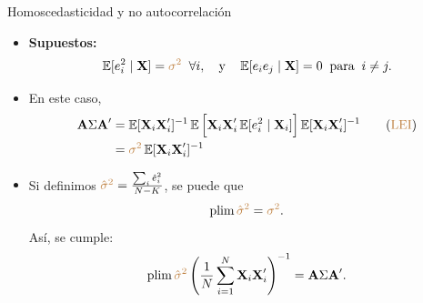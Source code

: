 \documentclass[10pt, xcolor=dvipsnames]{beamer}
\begin{document}
\begin{frame}{Homoscedasticidad y no autocorrelación}\label{DIAP:estVarCons}
\begin{itemize}
    \item \textbf{Supuestos:}
    \vspace{-0.75em}
    \[
    \operatorname{\mathbb{E}}[e_i^2 \mid \textbf{X}] = \textcolor{brown}{\sigma^2} \;\; \forall i, \quad \text{y} \quad \operatorname{\mathbb{E}}[e_i e_j \mid \textbf{X}] = 0 \;\; \text{para} \;\; i \neq j.
    \]
    \pause
    \item En este caso,
    \vspace{-0.75em}
    \begin{align*}
    \begin{split}
        \textbf{A} \Sigma \textbf{A}' &= \operatorname{\mathbb{E}}[\textbf{X}_i \textbf{X}_i']^{-1} \operatorname{\mathbb{E}}\Big[\textbf{X}_i \textbf{X}_i' \operatorname{\mathbb{E}}[e_i^2 \mid \textbf{X}_i]\Big] \operatorname{\mathbb{E}}[\textbf{X}_i \textbf{X}_i']^{-1} \quad \quad (\textcolor{brown}{\text{LEI}}) \\
        &= \textcolor{brown}{\sigma^2} \operatorname{\mathbb{E}}[\textbf{X}_i \textbf{X}_i']^{-1}
    \end{split}
    \end{align*}
    \pause
    \item Si definimos \(\textcolor{brown}{\hat{\sigma}^2} = \frac{\sum_{i}\hat{e}^2_i}{N-K}\), se puede \hyperlink{ANEX:estVarCons}{{}} que
    \vspace{-0.5em}
    \begin{align*}
    \begin{split}
        \plim \brown{\hat{\sigma}^2} = \brown{\sigma^2}.
    \end{split}
    \end{align*}
    \pause
    \vspace{-0.75em}
    Así, se cumple: 
    \[
        \plim \brown{\hat{\sigma}^2} \left(\frac{1}{N}\sum_{i=1}^{N}\XB_i \XB'_i \right)^{-1} = \AB \Sigma \AB'.
    \]
 \end{itemize}
\end{frame}
\end{document}
